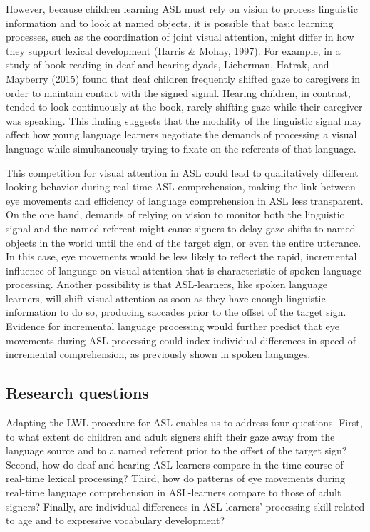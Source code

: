 \documentclass[oneside]{report}
\begin{document}
However, because children learning ASL must rely on vision to process
linguistic information and to look at named objects, it is possible that
basic learning processes, such as the coordination of joint visual
attention, might differ in how they support lexical development (Harris
\& Mohay, 1997). For example, in a study of book reading in deaf and
hearing dyads, Lieberman, Hatrak, and Mayberry (2015) found that deaf
children frequently shifted gaze to caregivers in order to maintain
contact with the signed signal. Hearing children, in contrast, tended to
look continuously at the book, rarely shifting gaze while their
caregiver was speaking. This finding suggests that the modality of the
linguistic signal may affect how young language learners negotiate the
demands of processing a visual language while simultaneously trying to
fixate on the referents of that language.

This competition for visual attention in ASL could lead to qualitatively
different looking behavior during real-time ASL comprehension, making
the link between eye movements and efficiency of language comprehension
in ASL less transparent. On the one hand, demands of relying on vision
to monitor both the linguistic signal and the named referent might cause
signers to delay gaze shifts to named objects in the world until the end
of the target sign, or even the entire utterance. In this case, eye
movements would be less likely to reflect the rapid, incremental
influence of language on visual attention that is characteristic of
spoken language processing. Another possibility is that ASL-learners,
like spoken language learners, will shift visual attention as soon as
they have enough linguistic information to do so, producing saccades
prior to the offset of the target sign. Evidence for incremental
language processing would further predict that eye movements during ASL
processing could index individual differences in speed of incremental
comprehension, as previously shown in spoken languages.

\subsection{Research questions}\label{research-questions}

Adapting the LWL procedure for ASL enables us to address four questions.
First, to what extent do children and adult signers shift their gaze
away from the language source and to a named referent prior to the
offset of the target sign? Second, how do deaf and hearing ASL-learners
compare in the time course of real-time lexical processing? Third, how
do patterns of eye movements during real-time language comprehension in
ASL-learners compare to those of adult signers? Finally, are individual
differences in ASL-learners' processing skill related to age and to
expressive vocabulary development?
\end{document}
